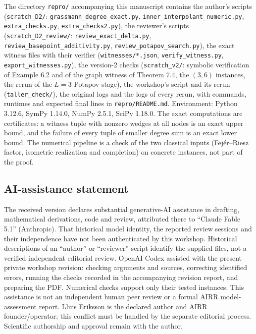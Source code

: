 \documentclass[
  11pt,
  a4paper,
]{article}
\begin{document}
The directory {\small\texttt{repro/\allowbreak{}}} accompanying this manuscript contains the
author's scripts ({\small\texttt{scratch\_\allowbreak{}D2/\allowbreak{}}}:
{\small\texttt{grassmann\_\allowbreak{}degree\_\allowbreak{}exact.\allowbreak{}py}},
{\small\texttt{inner\_\allowbreak{}interpolant\_\allowbreak{}numeric.\allowbreak{}py}}, {\small\texttt{extra\_\allowbreak{}checks.\allowbreak{}py}},
{\small\texttt{extra\_\allowbreak{}checks2.\allowbreak{}py}}), the reviewer's scripts
({\small\texttt{scratch\_\allowbreak{}D2\_\allowbreak{}review/\allowbreak{}}}: {\small\texttt{review\_\allowbreak{}exact\_\allowbreak{}delta.\allowbreak{}py}},
{\small\texttt{review\_\allowbreak{}basepoint\_\allowbreak{}additivity.\allowbreak{}py}},
{\small\texttt{review\_\allowbreak{}potapov\_\allowbreak{}search.\allowbreak{}py}}), the exact witness files with their
verifier ({\small\texttt{witnesses/\allowbreak{}*.\allowbreak{}json}}, {\small\texttt{verify\_\allowbreak{}witness.\allowbreak{}py}},
{\small\texttt{export\_\allowbreak{}witnesses.\allowbreak{}py}}), the version-2 checks
({\small\texttt{scratch\_\allowbreak{}v2/\allowbreak{}}}: symbolic verification of Example 6.2 and of the
graph witness of Theorem 7.4, the \((3,\allowbreak{}6)\) instances, the rerun of the
\(L=3\) Potapov stage), the workshop's script and its rerun
({\small\texttt{taller\_\allowbreak{}check/\allowbreak{}}}), the original logs and the logs of every
rerun, with commands, runtimes and expected final lines in
{\small\texttt{repro/\allowbreak{}README.\allowbreak{}md}}. Environment: Python 3.12.6, SymPy 1.14.0,
NumPy 2.5.1, SciPy 1.18.0. The exact computations are certificates: a
witness tuple with nonzero wedges at all nodes is an exact upper bound,
and the failure of every tuple of smaller degree sum is an exact lower
bound. The numerical pipeline is a check of the two classical inputs
(Fejér--Riesz factor, isometric realization and completion) on concrete
instances, not part of the proof.

\subsection{AI-assistance statement}\label{ai-assistance-statement}

The received version declares substantial generative-AI assistance in
drafting, mathematical derivations, code and review, attributed there to
``Claude Fable 5.1'' (Anthropic). That historical model identity, the
reported review sessions and their independence have not been
authenticated by this workshop. Historical descriptions of an ``author''
or ``reviewer'' script identify the supplied files, not a verified
independent editorial review. OpenAI Codex assisted with the present
private workshop revision: checking arguments and sources, correcting
identified errors, running the checks recorded in the accompanying
revision report, and preparing the PDF. Numerical checks support only
their tested instances. This assistance is not an independent human peer
review or a formal AIRR model-assessment report. Lluis Eriksson is the
declared author and AIRR founder/operator; this conflict must be handled
by the separate editorial process. Scientific authorship and approval
remain with the author.
\end{document}

